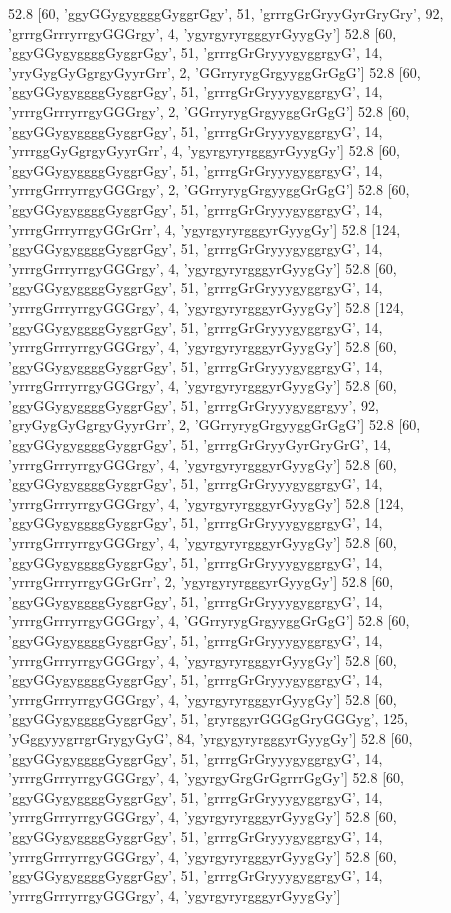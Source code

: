 52.8 [60, 'ggyGGygyggggGyggrGgy', 51, 'grrrgGrGryyGyrGryGry', 92, 'grrrgGrrryrrgyGGGrgy', 4, 'ygyrgyryrgggyrGyygGy']
52.8 [60, 'ggyGGygyggggGyggrGgy', 51, 'grrrgGrGryyygyggrgyG', 14, 'yryGygGyGgrgyGyyrGrr', 2, 'GGrryrygGrgyyggGrGgG']
52.8 [60, 'ggyGGygyggggGyggrGgy', 51, 'grrrgGrGryyygyggrgyG', 14, 'yrrrgGrrryrrgyGGGrgy', 2, 'GGrryrygGrgyyggGrGgG']
52.8 [60, 'ggyGGygyggggGyggrGgy', 51, 'grrrgGrGryyygyggrgyG', 14, 'yrrrggGyGgrgyGyyrGrr', 4, 'ygyrgyryrgggyrGyygGy']
52.8 [60, 'ggyGGygyggggGyggrGgy', 51, 'grrrgGrGryyygyggrgyG', 14, 'yrrrgGrrryrrgyGGGrgy', 2, 'GGrryrygGrgyyggGrGgG']
52.8 [60, 'ggyGGygyggggGyggrGgy', 51, 'grrrgGrGryyygyggrgyG', 14, 'yrrrgGrrryrrgyGGrGrr', 4, 'ygyrgyryrgggyrGyygGy']
52.8 [124, 'ggyGGygyggggGyggrGgy', 51, 'grrrgGrGryyygyggrgyG', 14, 'yrrrgGrrryrrgyGGGrgy', 4, 'ygyrgyryrgggyrGyygGy']
52.8 [60, 'ggyGGygyggggGyggrGgy', 51, 'grrrgGrGryyygyggrgyG', 14, 'yrrrgGrrryrrgyGGGrgy', 4, 'ygyrgyryrgggyrGyygGy']
52.8 [124, 'ggyGGygyggggGyggrGgy', 51, 'grrrgGrGryyygyggrgyG', 14, 'yrrrgGrrryrrgyGGGrgy', 4, 'ygyrgyryrgggyrGyygGy']
52.8 [60, 'ggyGGygyggggGyggrGgy', 51, 'grrrgGrGryyygyggrgyG', 14, 'yrrrgGrrryrrgyGGGrgy', 4, 'ygyrgyryrgggyrGyygGy']
52.8 [60, 'ggyGGygyggggGyggrGgy', 51, 'grrrgGrGryyygyggrgyy', 92, 'gryGygGyGgrgyGyyrGrr', 2, 'GGrryrygGrgyyggGrGgG']
52.8 [60, 'ggyGGygyggggGyggrGgy', 51, 'grrrgGrGryyGyrGryGrG', 14, 'yrrrgGrrryrrgyGGGrgy', 4, 'ygyrgyryrgggyrGyygGy']
52.8 [60, 'ggyGGygyggggGyggrGgy', 51, 'grrrgGrGryyygyggrgyG', 14, 'yrrrgGrrryrrgyGGGrgy', 4, 'ygyrgyryrgggyrGyygGy']
52.8 [124, 'ggyGGygyggggGyggrGgy', 51, 'grrrgGrGryyygyggrgyG', 14, 'yrrrgGrrryrrgyGGGrgy', 4, 'ygyrgyryrgggyrGyygGy']
52.8 [60, 'ggyGGygyggggGyggrGgy', 51, 'grrrgGrGryyygyggrgyG', 14, 'yrrrgGrrryrrgyGGrGrr', 2, 'ygyrgyryrgggyrGyygGy']
52.8 [60, 'ggyGGygyggggGyggrGgy', 51, 'grrrgGrGryyygyggrgyG', 14, 'yrrrgGrrryrrgyGGGrgy', 4, 'GGrryrygGrgyyggGrGgG']
52.8 [60, 'ggyGGygyggggGyggrGgy', 51, 'grrrgGrGryyygyggrgyG', 14, 'yrrrgGrrryrrgyGGGrgy', 4, 'ygyrgyryrgggyrGyygGy']
52.8 [60, 'ggyGGygyggggGyggrGgy', 51, 'grrrgGrGryyygyggrgyG', 14, 'yrrrgGrrryrrgyGGGrgy', 4, 'ygyrgyryrgggyrGyygGy']
52.8 [60, 'ggyGGygyggggGyggrGgy', 51, 'gryrggyrGGGgGryGGGyg', 125, 'yGggyyygrrgrGrygyGyG', 84, 'yrgygyryrgggyrGyygGy']
52.8 [60, 'ggyGGygyggggGyggrGgy', 51, 'grrrgGrGryyygyggrgyG', 14, 'yrrrgGrrryrrgyGGGrgy', 4, 'ygyrgyGrgGrGgrrrGgGy']
52.8 [60, 'ggyGGygyggggGyggrGgy', 51, 'grrrgGrGryyygyggrgyG', 14, 'yrrrgGrrryrrgyGGGrgy', 4, 'ygyrgyryrgggyrGyygGy']
52.8 [60, 'ggyGGygyggggGyggrGgy', 51, 'grrrgGrGryyygyggrgyG', 14, 'yrrrgGrrryrrgyGGGrgy', 4, 'ygyrgyryrgggyrGyygGy']
52.8 [60, 'ggyGGygyggggGyggrGgy', 51, 'grrrgGrGryyygyggrgyG', 14, 'yrrrgGrrryrrgyGGGrgy', 4, 'ygyrgyryrgggyrGyygGy']
